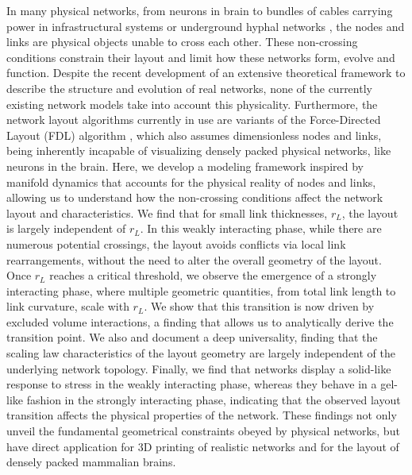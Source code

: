 {%
In many physical networks, from neurons in brain \cite{kasthuri2015saturated,oh2014mesoscale} to bundles of cables carrying power in infrastructural systems or underground hyphal networks \cite{friese1991spread}, the nodes and links are physical objects unable to cross each other.
These non-crossing conditions constrain their layout and limit how these networks form, evolve and function. 
Despite the recent development of an extensive theoretical framework to describe the structure and evolution of real networks, none of the currently existing network models take into account this physicality. 
Furthermore, the  network layout algorithms currently in use are variants of the Force-Directed Layout (FDL) algorithm \cite{kamada1989algorithm,fruchterman1991graph}, which also assumes dimensionless nodes and links, being inherently incapable of visualizing densely packed physical networks, like neurons in the brain.
Here, we develop a modeling framework inspired by manifold dynamics that accounts for the physical reality of nodes and links, allowing us to 
understand how the non-crossing conditions affect the network layout and characteristics. 
We find that for small link thicknesses, $r_L$, the layout is largely independent of $r_L$. 
In this weakly interacting phase, while there are numerous potential crossings, the layout avoids conflicts via local link rearrangements, without the need to alter the overall geometry of the layout. 
Once $r_L$ reaches a critical threshold, we observe the emergence of a strongly interacting phase, where multiple geometric quantities, from total link length to link curvature, scale with $r_L$. 
We show that this transition is now driven by excluded volume interactions, a finding that allows us to analytically derive the transition point.
We also
and document a deep universality, finding that the scaling law characteristics of the layout geometry are largely independent of the underlying network topology. 
Finally, we find that networks display a solid-like response to stress in the weakly interacting phase, whereas they behave in a gel-like fashion in the strongly interacting phase, indicating that the observed layout transition  affects the physical properties of the network. 
These findings not only unveil the fundamental geometrical constraints obeyed by physical networks, but have direct application for 3D printing of realistic networks and for the layout of densely packed mammalian brains.
} 
